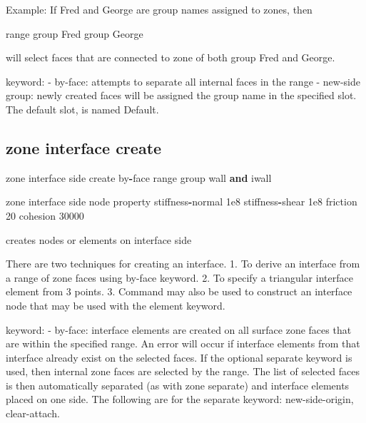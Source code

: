 \documentclass[a4paper, nobind]{templates/ociamthesis}
\newenvironment{Shaded}{\begin{snugshade}}{\end{snugshade}}
\newcommand{\BuiltInTok}[1]{#1}
\newcommand{\DecValTok}[1]{\textcolor[rgb]{0.00,0.00,0.81}{#1}}
\newcommand{\FloatTok}[1]{\textcolor[rgb]{0.00,0.00,0.81}{#1}}
\newcommand{\KeywordTok}[1]{\textcolor[rgb]{0.13,0.29,0.53}{\textbf{#1}}}
\newcommand{\NormalTok}[1]{#1}
\newcommand{\OperatorTok}[1]{\textcolor[rgb]{0.81,0.36,0.00}{\textbf{#1}}}
\newcommand{\StringTok}[1]{\textcolor[rgb]{0.31,0.60,0.02}{#1}}
\renewenvironment{Shaded}
{
  \vspace{10pt}%
  \begin{snugshade}%
}{%
  \end{snugshade}%
  \vspace{8pt}%
}
\begin{document}
Example: If Fred and George are group names assigned to zones, then

\begin{Shaded}
\begin{Highlighting}[]
\BuiltInTok{range}\NormalTok{ group }\StringTok{\textquotesingle{}Fred\textquotesingle{}}\NormalTok{ group }\StringTok{\textquotesingle{}George\textquotesingle{}}
\end{Highlighting}
\end{Shaded}

will select faces that are connected to zone of both group Fred and
George.

keyword: - by-face: attempts to separate all internal faces in the range
- new-side group: newly created faces will be assigned the group name in
the specified slot. The default slot, is named Default.

\hypertarget{zone-interface-create}{%
\subsection{zone interface create}\label{zone-interface-create}}

\begin{Shaded}
\begin{Highlighting}[]
\NormalTok{zone interface }\StringTok{\textquotesingle{}side\textquotesingle{}}\NormalTok{ create by}\OperatorTok{{-}}\NormalTok{face }\BuiltInTok{range}\NormalTok{ group }\StringTok{\textquotesingle{}wall\textquotesingle{}} \KeywordTok{and} \StringTok{\textquotesingle{}iwall\textquotesingle{}}

\NormalTok{zone interface }\StringTok{\textquotesingle{}side\textquotesingle{}}\NormalTok{ node }\BuiltInTok{property}\NormalTok{ stiffness}\OperatorTok{{-}}\NormalTok{normal }\FloatTok{1e8}\NormalTok{ stiffness}\OperatorTok{{-}}\NormalTok{shear }\FloatTok{1e8}\NormalTok{ friction }\DecValTok{20}\NormalTok{ cohesion }\DecValTok{30000}
\end{Highlighting}
\end{Shaded}

creates nodes or elements on interface side

There are two techniques for creating an interface. 1. To derive an
interface from a range of zone faces using by-face keyword. 2. To
specify a triangular interface element from 3 points. 3. Command may
also be used to construct an interface node that may be used with the
element keyword.

keyword: - by-face: interface elements are created on all surface zone
faces that are within the specified range. An error will occur if
interface elements from that interface already exist on the selected
faces. If the optional separate keyword is used, then internal zone
faces are selected by the range. The list of selected faces is then
automatically separated (as with zone separate) and interface elements
placed on one side. The following are for the separate keyword:
new-side-origin, clear-attach.
\end{document}
